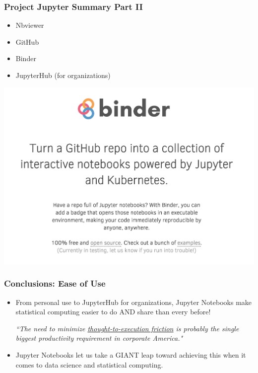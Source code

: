 \documentclass[xcolor={dvipsnames}]{beamer}
\newcommand{\ft}{\frametitle}
\newcommand{\bi}{\begin{itemize}}
\newcommand{\ei}{\end{itemize}}
\begin{document}
\begin{frame}
\ft{Project Jupyter Summary Part II}
\begin{minipage}{.45\textwidth}
\bi
	\item Nbviewer
	\item GitHub
	\item Binder
	\item JupyterHub (for organizations)
\ei
\end{minipage}
\begin{minipage}{.45\textwidth}
	\includegraphics[width = \textwidth]{mybinder.png}
\end{minipage}
\end{frame}

\begin{frame}
\ft{Conclusions: Ease of Use}
\bi
	\item From personal use to JupyterHub for organizations, Jupyter Notebooks make statistical computing easier to do AND share than every before!
	
	\begin{center}
		\emph{``The need to minimize \underline{thought-to-execution friction} is probably the single biggest productivity requirement in corporate America."}
	\end{center}
	
	\item Jupyter Notebooks let us take a GIANT leap toward achieving this when it comes to data science and statistical computing.
\ei
\end{frame}
\end{document}

